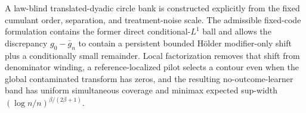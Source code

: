 A law-blind translated-dyadic circle bank is constructed explicitly from the fixed cumulant order, separation, and treatment-noise scale. The admissible fixed-code formulation contains the former direct conditional-\(L^1\) ball and allows the discrepancy \(g_0-\bar g_n\) to contain a persistent bounded H\"older modifier-only shift plus a conditionally small remainder. Local factorization removes that shift from denominator winding, a reference-localized pilot selects a contour even when the global contaminated transform has zeros, and the resulting no-outcome-learner band has uniform simultaneous coverage and minimax expected sup-width \((\log n/n)^{\beta/(2\beta+1)}\).